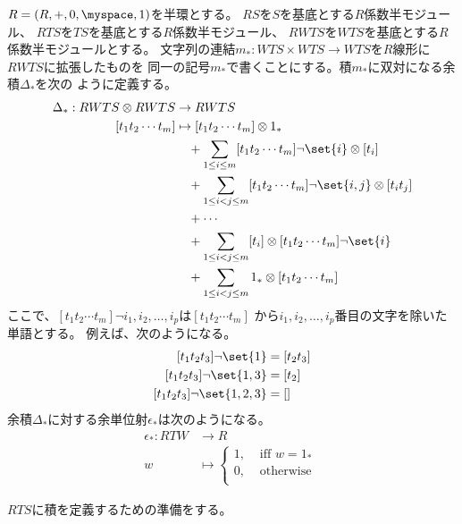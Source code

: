 	$R=(R,+,0,\myspace,1)$を半環とする。
	$RS$を$S$を基底とする$R$係数半モジュール、
	$RTS$を$TS$を基底とする$R$係数半モジュール、
	$RWTS$を$WTS$を基底とする$R$係数半モジュールとする。
	文字列の連結$m_*:WTS\times WTS\to WTS$を$R$線形に$RWTS$に拡張したものを
	同一の記号$m_*$で書くことにする。積$m_*$に双対になる余積$\Delta_*$を次の
	ように定義する。
	\begin{equation}\begin{split} %
		\Delta_*: RWTS\otimes RWTS &\to RWTS \\
			[t_1t_2\cdots t_m] &\mapsto [t_1t_2\cdots t_m]\otimes 1_* \\
				&\quad + \sum_{1\le i\le m}[t_1t_2\cdots t_m]\neg\set{i}\otimes [t_i] \\
				&\quad + \sum_{1\le i<j\le m}[t_1t_2\cdots t_m]\neg\set{i,j}\otimes [t_it_j] \\
				&\quad + \cdots \\
				&\quad + \sum_{1\le i<j\le m}[t_i]\otimes [t_1t_2\cdots t_m]\neg\set{i} \\
				&\quad + \sum_{1\le i<j\le m}1_*\otimes [t_1t_2\cdots t_m] \\
	\end{split}\end{equation} %
	ここで、$[t_1t_2\cdots t_m]\neg{i_1,i_2,\dots,i_p}$は$[t_1t_2\cdots t_m]$
	から$i_1,i_2,\dots,i_p$番目の文字を除いた単語とする。
	例えば、次のようになる。
	\begin{equation*}\begin{split} %
		[t_1t_2t_3]\neg\set{1} &= [t_2t_3] \\
		[t_1t_2t_3]\neg\set{1,3} &= [t_2] \\
		[t_1t_2t_3]\neg\set{1,2,3} &= [] \\
	\end{split}\end{equation*} %
	余積$\Delta_*$に対する余単位射$\epsilon_*$は次のようになる。
	\begin{equation}\begin{split} %
		\epsilon_*: RTW &\to R \\
		w &\mapsto \begin{cases} %
			1, &\text{ iff }w=1_* \\
			0, &\text{ otherwise } \\
		\end{cases} %
	\end{split}\end{equation} %

	$RTS$に積を定義するための準備をする。


